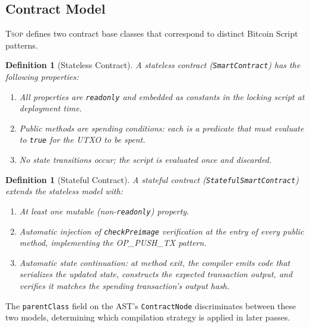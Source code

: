 \documentclass[11pt,a4paper]{article}
\newtheorem{definition}[theorem]{Definition}
\newcommand{\tsop}{\textsc{Tsop}}
\begin{document}
\subsection{Contract Model}
\label{sec:contract-model}

\tsop{} defines two contract base classes that correspond to distinct
Bitcoin Script patterns.

\begin{definition}[Stateless Contract]
A \emph{stateless contract} (\texttt{SmartContract}) has the following
properties:
\begin{enumerate}[label=(\alph*)]
  \item All properties are \texttt{readonly} and embedded as constants in
    the locking script at deployment time.
  \item Public methods are spending conditions: each is a predicate that must
    evaluate to \texttt{true} for the UTXO to be spent.
  \item No state transitions occur; the script is evaluated once and discarded.
\end{enumerate}
\end{definition}

\begin{definition}[Stateful Contract]
A \emph{stateful contract} (\texttt{StatefulSmartContract}) extends the
stateless model with:
\begin{enumerate}[label=(\alph*)]
  \item At least one mutable (non-\texttt{readonly}) property.
  \item Automatic injection of \texttt{checkPreimage} verification at the
    entry of every public method, implementing the OP\_PUSH\_TX pattern.
  \item Automatic state continuation: at method exit, the compiler emits
    code that serializes the updated state, constructs the expected
    transaction output, and verifies it matches the spending transaction's
    output hash.
\end{enumerate}
\end{definition}

The \texttt{parentClass} field on the AST's \texttt{ContractNode}
discriminates between these two models, determining which compilation
strategy is applied in later passes.

\end{document}
